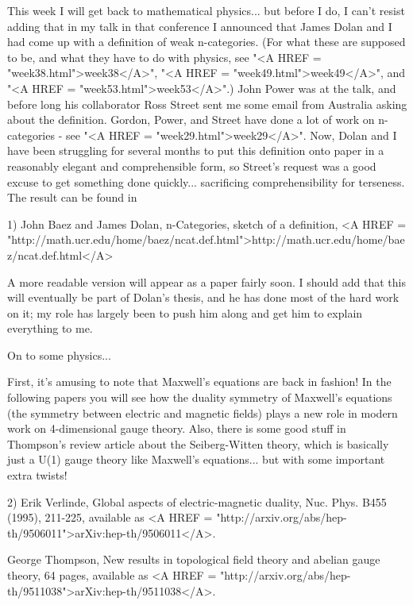 



This week I will get back to mathematical physics... but before I do, I
can't resist adding that in my talk in that conference I announced that
James Dolan and I had come up with a definition of weak n-categories.
(For what these are supposed to be, and what they have to do with
physics, see "<A HREF = "week38.html">week38</A>", "<A HREF = "week49.html">week49</A>", and "<A HREF = "week53.html">week53</A>".)  John Power was at the
talk, and before long his collaborator Ross Street sent me some email
from Australia asking about the definition.  Gordon,
Power, and Street have done a lot of work on n-categories - see
"<A HREF = "week29.html">week29</A>".  Now, Dolan and I have
been struggling for several months to 
put this definition onto paper in a reasonably elegant and
comprehensible form, so Street's request was a good excuse to get
something done quickly...  sacrificing comprehensibility for terseness.
The result can be found in

1) John Baez and James Dolan, n-Categories, sketch of a definition, 
<A HREF = "http://math.ucr.edu/home/baez/ncat.def.html">http://math.ucr.edu/home/baez/ncat.def.html</A>

A more readable version will appear as a paper fairly soon.  I should
add that this will eventually be part of Dolan's thesis, and he has
done most of the hard work on it; my role has largely been to push him
along and get him to explain everything to me.

On to some physics...

First, it's amusing to note that Maxwell's equations are back in
fashion!  In the following papers you will see how the duality
symmetry of Maxwell's equations (the symmetry between electric and
magnetic fields) plays a new role in modern work on 4-dimensional gauge
theory.  Also, there is some good stuff in Thompson's review article
about the Seiberg-Witten theory, which is basically just a U(1) gauge
theory like Maxwell's equations... but with some important extra twists!

2) Erik Verlinde, Global aspects of electric-magnetic duality, Nuc.
Phys.  B455 (1995), 211-225, available as
<A HREF = "http://arxiv.org/abs/hep-th/9506011">arXiv:hep-th/9506011</A>.

George Thompson, New results in topological field theory and abelian
gauge theory, 64 pages, available as
<A HREF = "http://arxiv.org/abs/hep-th/9511038">arXiv:hep-th/9511038</A>.


